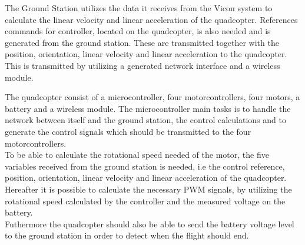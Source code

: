 The Ground Station utilizes the data it receives from the Vicon system to calculate the linear velocity and linear acceleration of the quadcopter. References commands for controller, located on the quadcopter, is also needed and is generated from the ground station. These are transmitted together with the position, orientation, linear velocity and linear acceleration to the quadcopter. This is transmitted by utilizing a generated network interface and a wireless module.

The quadcopter consist of a microcontroller, four motorcontrollers, four motors, a battery and a wireless module. The microcontroller main tasks is to handle the network between itself and the ground station, the control calculations and to generate the control signals which should be transmitted to the four motorcontrollers. \\To be able to calculate the rotational speed needed of the motor, the five variables received from the ground station is needed, i.e the control reference, position, orientation, linear velocity and linear acceleration of the quadcopter. Hereafter it is possible to calculate the necessary PWM signals, by utilizing the rotational speed calculated by the controller and the measured voltage on the battery. \\Futhermore the quadcopter should also be able to send the battery voltage level to the ground station in order to detect when the flight should end.






